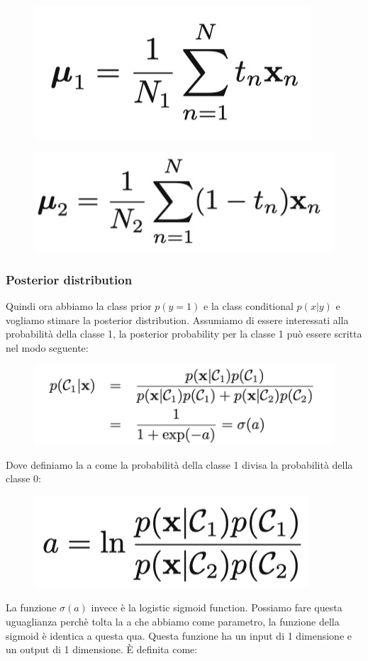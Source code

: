 \documentclass[14pt]{extreport}
\begin{document}
\begin{figure}[H]
\centering
\includegraphics[width=0.3\linewidth]{208.jpeg}
\end{figure}

\begin{figure}[H]
\centering
\includegraphics[width=0.3\linewidth]{209.jpeg}
\end{figure}

\subsubsection{Posterior distribution}

Quindi ora abbiamo la class prior $p(y=1)$ e la class conditional $p(x|y)$ e vogliamo stimare la posterior distribution. Assumiamo di essere
interessati alla probabilità della classe 1, la posterior probability per la classe 1 può essere scritta nel modo seguente:

\begin{figure}[H]
\centering
\includegraphics[width=0.6\linewidth]{165.jpeg}
\end{figure}

Dove definiamo la a come la probabilità della classe 1 divisa la probabilità della classe 0:

\begin{figure}[H]
\centering
\includegraphics[width=0.3\linewidth]{166.jpeg}
\end{figure}

La funzione $\sigma(a)$ invece è la logistic sigmoid function. Possiamo fare questa uguaglianza perchè tolta la a che abbiamo come parametro, la
funzione della sigmoid è identica a questa qua. Questa funzione ha un input di 1 dimensione e un output di 1 dimensione. È definita come:
\end{document}
